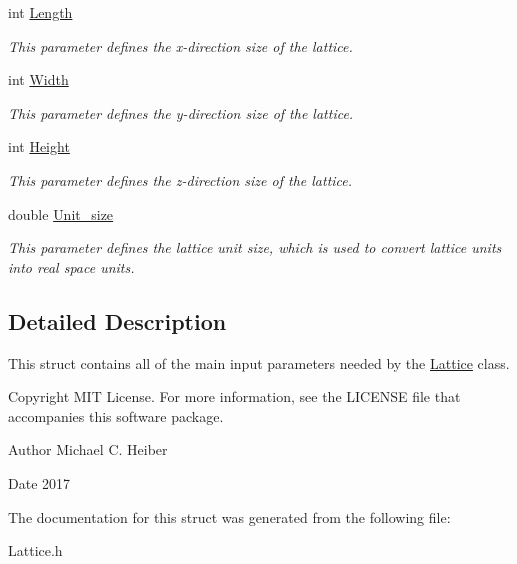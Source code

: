 \begin{DoxyCompactItemize}
\mbox{\label{struct_parameters___lattice_a99c7d553111bb660032bb7ca6f592da6}} 
int \hyperlink{struct_parameters___lattice_a99c7d553111bb660032bb7ca6f592da6}{Length}
\begin{DoxyCompactList}\small\item\em This parameter defines the x-\/direction size of the lattice. \end{DoxyCompactList}\item 
\mbox{\label{struct_parameters___lattice_a40f8633b47d204f471d041a0d8216e5b}} 
int \hyperlink{struct_parameters___lattice_a40f8633b47d204f471d041a0d8216e5b}{Width}
\begin{DoxyCompactList}\small\item\em This parameter defines the y-\/direction size of the lattice. \end{DoxyCompactList}\item 
\mbox{\label{struct_parameters___lattice_a1b59e1a307ad945fb86f44b68354f605}} 
int \hyperlink{struct_parameters___lattice_a1b59e1a307ad945fb86f44b68354f605}{Height}
\begin{DoxyCompactList}\small\item\em This parameter defines the z-\/direction size of the lattice. \end{DoxyCompactList}\item 
\mbox{\label{struct_parameters___lattice_a5f9628b968ba4206a7650c774827b1f0}} 
double \hyperlink{struct_parameters___lattice_a5f9628b968ba4206a7650c774827b1f0}{Unit\+\_\+size}
\begin{DoxyCompactList}\small\item\em This parameter defines the lattice unit size, which is used to convert lattice units into real space units. \end{DoxyCompactList}\end{DoxyCompactItemize}


\subsection{Detailed Description}
This struct contains all of the main input parameters needed by the \hyperlink{class_lattice}{Lattice} class. 

\begin{DoxyCopyright}{Copyright}
M\+IT License. For more information, see the L\+I\+C\+E\+N\+SE file that accompanies this software package. 
\end{DoxyCopyright}
\begin{DoxyAuthor}{Author}
Michael C. Heiber 
\end{DoxyAuthor}
\begin{DoxyDate}{Date}
2017 
\end{DoxyDate}


The documentation for this struct was generated from the following file\+:\begin{DoxyCompactItemize}
\item 
Lattice.\+h\end{DoxyCompactItemize}
